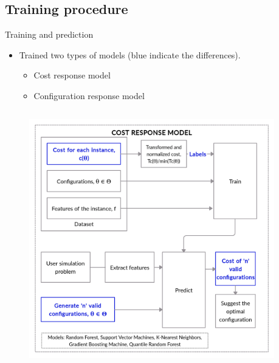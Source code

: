 \documentclass[10pt]{beamer}
\begin{document}
\subsection{Training procedure}
\begin{frame}[t]{Training and prediction}
\begin{itemize}
\item Trained two types of models (blue indicate the differences).
\begin{itemize}
  \item Cost response model
  \item Configuration response model

\end{itemize}
\end{itemize}
\begin{columns}[T] %
\begin{column}{.5\textwidth}
\begin{figure}[!ht]
\centering
\includegraphics[width=\linewidth]{images/cost_response_new.jpg}
\captionsetup{justification=justified}
\label{fig:cost_new1}
\end{figure}
\end{column}%
\hfill%
\begin{column}{.5\textwidth}
\end{column}%
\end{columns}
\end{frame}
\end{document}
